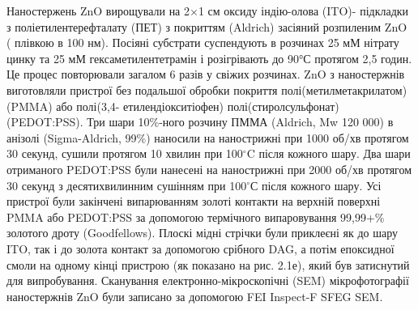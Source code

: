 \documentclass[a4paper,14pt]{extreport}
\begin{document}
Наностержень ZnO вирощували на 2$\times$1 см оксиду індію-олова (ITO)-
підкладки з поліетилентерефталату (ПЕТ) з покриттям (Aldrich)
засіяний розпиленим ZnO ( плівкою в 100 нм). Посіяні субстрати
суспендують в розчинах 25 мМ нітрату цинку та 25 мМ
гексаметилентетрамін і розігрівають до 90°С протягом 2,5 годин. Це
процес повторювали загалом 6 разів у свіжих розчинах. ZnO
з наностержнів виготовляли пристрої без подальшої обробки
покриття полі(метилметакрилатом) (PMMA) або полі(3,4-
етилендіокситіофен) полі(стиролсульфонат) (PEDOT:PSS).
Три шари 10\%-ного розчину ПММА (Aldrich, Mw 120 000)
в анізолі (Sigma-Aldrich, 99\%) наносили на нанострижні при 1000 об/хв протягом 30 секунд, сушили протягом 10 хвилин при 100$^{\circ}$C
після кожного шару. Два шари отриманого PEDOT:PSS   були нанесені на нанострижні при 2000 об/хв протягом 30 секунд з десятихвилинним сушінням
при 100$^{\circ}$С після кожного шару. Усі пристрої були закінчені випарюванням
золоті контакти на верхній поверхні PMMA або PEDOT:PSS
за допомогою термічного випаровування 99,99+\% золотого дроту (Goodfellows).
Плоскі мідні стрічки були приклеєні як до шару ITO, так і до золота
контакт за допомогою срібного DAG, а потім епоксидної смоли на одному кінці пристрою
(як показано на рис. 2.1е), який був затиснутий для випробування. Сканування
електронно-мікроскопічні (SEM) мікрофотографії наностержнів ZnO були
записано за допомогою FEI Inspect-F SFEG SEM.\\ 
\end{document}
